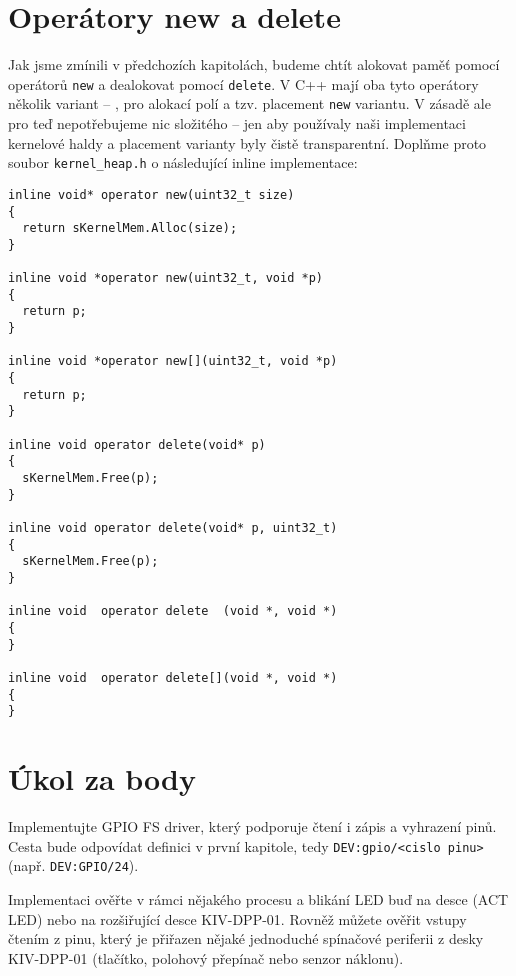 \documentclass{article}
\begin{document}
\section{Operátory new a delete}

Jak jsme zmínili v předchozích kapitolách, budeme chtít alokovat paměť pomocí operátorů \texttt{new} a dealokovat pomocí \texttt{delete}. V C++ mají oba tyto operátory několik variant -- , pro alokací polí a tzv. placement \texttt{new} variantu. V zásadě ale pro teď nepotřebujeme nic složitého -- jen aby používaly naši implementaci kernelové haldy a placement varianty byly čistě transparentní. Doplňme proto soubor \texttt{kernel\_heap.h} o následující inline implementace:
\begin{lstlisting}
inline void* operator new(uint32_t size)
{
  return sKernelMem.Alloc(size);
}

inline void *operator new(uint32_t, void *p)
{
  return p;
}

inline void *operator new[](uint32_t, void *p)
{
  return p;
}

inline void operator delete(void* p)
{
  sKernelMem.Free(p);
}

inline void operator delete(void* p, uint32_t)
{
  sKernelMem.Free(p);
}

inline void  operator delete  (void *, void *)
{
}

inline void  operator delete[](void *, void *)
{
}
\end{lstlisting}





\section{Úkol za body}

Implementujte GPIO FS driver, který podporuje čtení i zápis a vyhrazení pinů. Cesta bude odpovídat definici v první kapitole, tedy \texttt{DEV:gpio/<cislo pinu>} (např. \texttt{DEV:GPIO/24}).

Implementaci ověřte v rámci nějakého procesu a blikání LED buď na desce (ACT LED) nebo na rozšiřující desce KIV-DPP-01. Rovněž můžete ověřit vstupy čtením z pinu, který je přiřazen nějaké jednoduché spínačové periferii z desky KIV-DPP-01 (tlačítko, polohový přepínač nebo senzor náklonu).
\end{document}
